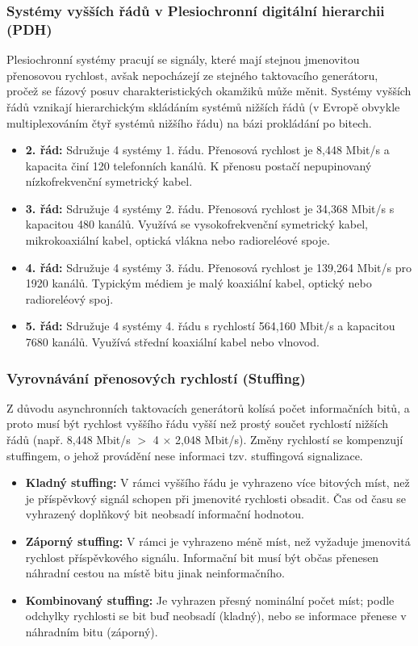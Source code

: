     \subsubsection{Systémy vyšších řádů v Plesiochronní digitální hierarchii (PDH)}
        Plesiochronní systémy pracují se signály, které mají stejnou jmenovitou přenosovou rychlost, avšak nepocházejí ze stejného taktovacího generátoru, pročež se fázový posuv charakteristických okamžiků může měnit. Systémy vyšších řádů vznikají hierarchickým skládáním systémů nižších řádů (v Evropě obvykle multiplexováním čtyř systémů nižšího řádu) na bázi prokládání po bitech.
        
        \begin{itemize}
            \item \textbf{2. řád:} Sdružuje 4 systémy 1. řádu. Přenosová rychlost je 8,448 Mbit/s a kapacita činí 120 telefonních kanálů. K přenosu postačí nepupinovaný nízkofrekvenční symetrický kabel.
            \item \textbf{3. řád:} Sdružuje 4 systémy 2. řádu. Přenosová rychlost je 34,368 Mbit/s s kapacitou 480 kanálů. Využívá se vysokofrekvenční symetrický kabel, mikrokoaxiální kabel, optická vlákna nebo radioreléové spoje.
            \item \textbf{4. řád:} Sdružuje 4 systémy 3. řádu. Přenosová rychlost je 139,264 Mbit/s pro 1920 kanálů. Typickým médiem je malý koaxiální kabel, optický nebo radioreléový spoj.
            \item \textbf{5. řád:} Sdružuje 4 systémy 4. řádu s rychlostí 564,160 Mbit/s a kapacitou 7680 kanálů. Využívá střední koaxiální kabel nebo vlnovod.
        \end{itemize}
        
    \subsubsection*{Vyrovnávání přenosových rychlostí (Stuffing)}
        
        Z důvodu asynchronních taktovacích generátorů kolísá počet informačních bitů, a proto musí být rychlost vyššího řádu vyšší než prostý součet rychlostí nižších řádů (např. 8,448 Mbit/s $>$ 4 $\times$ 2,048 Mbit/s). Změny rychlostí se kompenzují stuffingem, o jehož provádění nese informaci tzv. stuffingová signalizace.
        
        \begin{itemize}
            \item \textbf{Kladný stuffing:} V rámci vyššího řádu je vyhrazeno více bitových míst, než je příspěvkový signál schopen při jmenovité rychlosti obsadit. Čas od času se vyhrazený doplňkový bit neobsadí informační hodnotou.
            \item \textbf{Záporný stuffing:} V rámci je vyhrazeno méně míst, než vyžaduje jmenovitá rychlost příspěvkového signálu. Informační bit musí být občas přenesen náhradní cestou na místě bitu jinak neinformačního.
            \item \textbf{Kombinovaný stuffing:} Je vyhrazen přesný nominální počet míst; podle odchylky rychlosti se bit buď neobsadí (kladný), nebo se informace přenese v náhradním bitu (záporný).
        \end{itemize}
        
